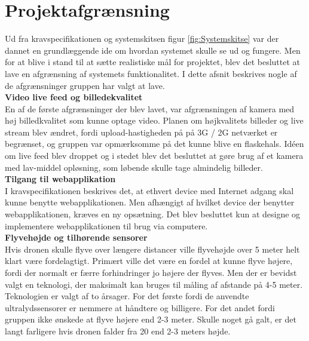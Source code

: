 \chapter{Projektafgrænsning}



Ud fra kravspecifikationen og systemskitsen figur \ref{fig:Systemskitse} var der dannet en grundlæggende ide om hvordan systemet skulle se ud og fungere. Men for at blive i stand til at sætte realistiske mål for projektet, blev det besluttet at lave en afgrænsning af systemets funktionalitet. I dette afsnit beskrives nogle af de afgrænsninger gruppen har valgt at lave. \\


\textbf{Video live feed og billedekvalitet}\\
En af de første afgrænsninger der blev lavet, var afgrænsningen af kamera med høj billedkvalitet som kunne optage video. Planen om højkvalitets billeder og live stream blev ændret, fordi upload-hastigheden på på 3G / 2G netværket er begrænset, og gruppen var opmærksomme på det kunne blive en flaskehals. Idéen om live feed blev droppet og i stedet blev det besluttet at gøre brug af et kamera med lav-middel opløsning, som løbende skulle tage almindelig billeder.\\

\textbf{Tilgang til webapplikation}\\
I kravspecifikationen beskrives det, at ethvert device med Internet adgang skal kunne benytte webapplikationen. Men afhængigt af hvilket device der benytter webapplikationen, kræves en ny opsætning. Det blev besluttet kun at designe og implementere webapplikationen til brug via computere.\\

\textbf{Flyvehøjde og tilhørende sensorer}\\
Hvis dronen skulle flyve over længere distancer ville flyvehøjde over 5 meter helt klart være fordelagtigt. Primært ville det være en fordel at kunne flyve højere, fordi der normalt er færre forhindringer jo højere der flyves. Men der er bevidst valgt en teknologi, der maksimalt kan bruges til måling af afstande på 4-5 meter. Teknologien er valgt af to årsager. For det første fordi de anvendte ultralydssensorer er nemmere at håndtere og billigere. For det andet fordi gruppen ikke ønskede at flyve højere end 2-3 meter. Skulle noget gå galt, er det langt farligere hvis dronen falder fra 20 end 2-3 meters højde.  

